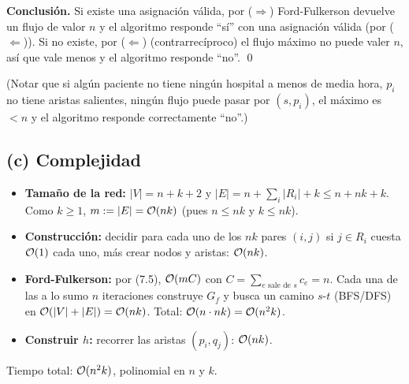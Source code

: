 \textbf{Conclusión.} Si existe una asignación válida, por ($\Rightarrow$) Ford-Fulkerson devuelve un flujo de valor $n$ y el algoritmo responde ``sí'' con una asignación válida (por ($\Leftarrow$)). Si no existe, por ($\Leftarrow$) (contrarrecíproco) el flujo máximo no puede valer $n$, así que vale menos y el algoritmo responde ``no''. \qed

(Notar que si algún paciente no tiene ningún hospital a menos de media hora, $p_i$ no tiene aristas salientes, ningún flujo puede pasar por $(s,p_i)$, el máximo es $<n$ y el algoritmo responde correctamente ``no''.)

\subsection*{(c) Complejidad}

\begin{itemize}
\item \textbf{Tamaño de la red:} $|V|=n+k+2$ y $|E|=n+\sum_i|R_i|+k\le n+nk+k$. Como $k\ge1$, $m:=|E|=\mathcal{O}(nk)$ (pues $n\le nk$ y $k\le nk$).
\item \textbf{Construcción:} decidir para cada uno de los $nk$ pares $(i,j)$ si $j\in R_i$ cuesta $\mathcal{O}(1)$ cada uno, más crear nodos y aristas: $\mathcal{O}(nk)$.
\item \textbf{Ford-Fulkerson:} por (7.5), $\mathcal{O}(mC)$ con $C=\sum_{e\text{ sale de }s}c_e=n$. Cada una de las a lo sumo $n$ iteraciones construye $G_f$ y busca un camino $s$-$t$ (BFS/DFS) en $\mathcal{O}(|V|+|E|)=\mathcal{O}(nk)$. Total: $\mathcal{O}(n\cdot nk)=\mathcal{O}(n^2k)$.
\item \textbf{Construir $h$:} recorrer las aristas $(p_i,q_j)$: $\mathcal{O}(nk)$.
\end{itemize}

Tiempo total: $\mathcal{O}(n^2k)$, polinomial en $n$ y $k$.


